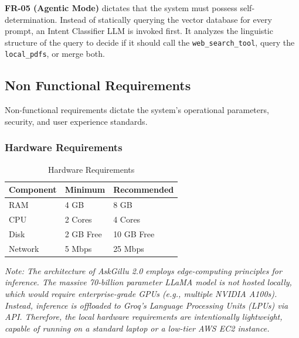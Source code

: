\documentclass[12pt,a4paper]{report}
\begin{document}
\textbf{FR-05 (Agentic Mode)} dictates that the system must possess self-determination. Instead of statically querying the vector database for every prompt, an Intent Classifier LLM is invoked first. It analyzes the linguistic structure of the query to decide if it should call the \texttt{web\_search\_tool}, query the \texttt{local\_pdfs}, or merge both.

\subsection{Non Functional Requirements}
Non-functional requirements dictate the system's operational parameters, security, and user experience standards.

\subsubsection{Hardware Requirements}
\begin{table}[h]
\centering
\caption{Hardware Requirements}
\label{tab:hard_req}
\begin{tabular}{|l|l|l|}
\hline
\textbf{Component} & \textbf{Minimum} & \textbf{Recommended} \\ \hline
RAM & 4 GB & 8 GB \\ \hline
CPU & 2 Cores & 4 Cores \\ \hline
Disk & 2 GB Free & 10 GB Free \\ \hline
Network & 5 Mbps & 25 Mbps \\ \hline
\end{tabular}
\end{table}
\textit{Note: The architecture of AskGillu 2.0 employs edge-computing principles for inference. The massive 70-billion parameter LLaMA model is not hosted locally, which would require enterprise-grade GPUs (e.g., multiple NVIDIA A100s). Instead, inference is offloaded to Groq's Language Processing Units (LPUs) via API. Therefore, the local hardware requirements are intentionally lightweight, capable of running on a standard laptop or a low-tier AWS EC2 instance.}
\end{document}

